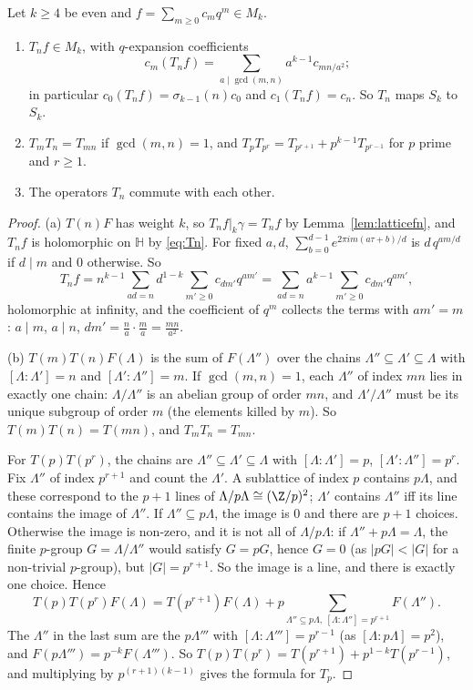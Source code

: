 \begin{theorem}[Hecke]\label{thm:heckeTn}
Let $k\ge4$ be even and $f=\sum_{m\ge0}c_mq^m\in M_k$.
\begin{enumerate}[label=(\alph*)]
\item $T_nf\in M_k$, with $q$-expansion coefficients
\[
c_m(T_nf)=\sum_{a\mid\gcd(m,n)}a^{k-1}c_{mn/a^2};
\]
in particular $c_0(T_nf)=\sigma_{k-1}(n)c_0$ and $c_1(T_nf)=c_n$. So $T_n$ maps $S_k$ to $S_k$.
\item $T_mT_n=T_{mn}$ if $\gcd(m,n)=1$, and $T_pT_{p^r}=T_{p^{r+1}}+p^{k-1}T_{p^{r-1}}$ for $p$ prime and $r\ge1$.
\item The operators $T_n$ commute with each other.
\end{enumerate}
\end{theorem}
\begin{proof}
(a) $T(n)F$ has weight $k$, so $T_nf|_k\gamma=T_nf$ by Lemma~\ref{lem:latticefn}, and $T_nf$ is holomorphic on $\mathbb H$ by \eqref{eq:Tn}. For fixed $a,d$,
$\sum_{b=0}^{d-1}e^{2\pi im(a\tau+b)/d}$ is $d\,q^{am/d}$ if $d\mid m$ and $0$ otherwise. So
\[
T_nf=n^{k-1}\sum_{ad=n}d^{1-k}\sum_{m'\ge0}c_{dm'}q^{am'}=\sum_{ad=n}a^{k-1}\sum_{m'\ge0}c_{dm'}q^{am'},
\]
holomorphic at infinity, and the coefficient of $q^m$ collects the terms with $am'=m$: $a\mid m$, $a\mid n$, $dm'=\frac na\cdot\frac ma=\frac{mn}{a^2}$.

(b) $T(m)T(n)F(\Lambda)$ is the sum of $F(\Lambda'')$ over the chains $\Lambda''\subseteq\Lambda'\subseteq\Lambda$ with $[\Lambda:\Lambda']=n$ and $[\Lambda':\Lambda'']=m$. If
$\gcd(m,n)=1$, each $\Lambda''$ of index $mn$ lies in exactly one chain: $\Lambda/\Lambda''$ is an abelian group of order $mn$, and $\Lambda'/\Lambda''$ must be its
unique subgroup of order $m$ (the elements killed by $m$). So $T(m)T(n)=T(mn)$, and $T_mT_n=T_{mn}$.

For $T(p)T(p^r)$, the chains are $\Lambda''\subseteq\Lambda'\subseteq\Lambda$ with $[\Lambda:\Lambda']=p$, $[\Lambda':\Lambda'']=p^r$. Fix $\Lambda''$ of index $p^{r+1}$ and
count the $\Lambda'$. A sublattice of index $p$ contains $p\Lambda$, and these correspond to the $p+1$ lines of $\Lambda/p\Lambda\cong(\Z/p)^2$; $\Lambda'$ contains
$\Lambda''$ iff its line contains the image of $\Lambda''$. If $\Lambda''\subseteq p\Lambda$, the image is $0$ and there are $p+1$ choices. Otherwise the image is
non-zero, and it is not all of $\Lambda/p\Lambda$: if $\Lambda''+p\Lambda=\Lambda$, the finite $p$-group $G=\Lambda/\Lambda''$ would satisfy $G=pG$, hence $G=0$ (as
$|pG|<|G|$ for a non-trivial $p$-group), but $|G|=p^{r+1}$. So the image is a line, and there is exactly one choice. Hence
\[
T(p)T(p^r)F(\Lambda)=T(p^{r+1})F(\Lambda)+p\sum_{\Lambda''\subseteq p\Lambda,\ [\Lambda:\Lambda'']=p^{r+1}}F(\Lambda'').
\]
The $\Lambda''$ in the last sum are the $p\Lambda'''$ with $[\Lambda:\Lambda''']=p^{r-1}$ (as $[\Lambda:p\Lambda]=p^2$), and $F(p\Lambda''')=p^{-k}F(\Lambda''')$. So
$T(p)T(p^r)=T(p^{r+1})+p^{1-k}T(p^{r-1})$, and multiplying by $p^{(r+1)(k-1)}$ gives the formula for $T_p$.


\end{proof}
